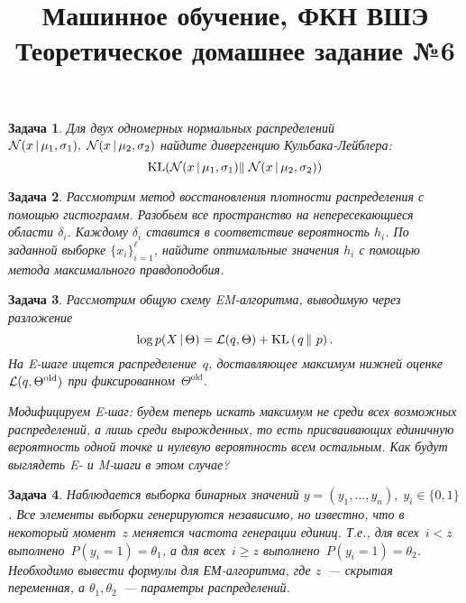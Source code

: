 \documentclass[12pt,fleqn]{article}
\title{Машинное обучение, ФКН ВШЭ\\Теоретическое домашнее задание №6}
\author{}
\date{}
\newtheorem{esProblem}{Задача}
\begin{document}
\maketitle

\begin{esProblem}
    Для двух одномерных нормальных распределений $\mathcal{N}(x\mspace{3mu}{|}\mspace{3mu} \mu_1, \sigma_1), \; \mathcal{N}(x\mspace{3mu}{|}\mspace{3mu} \mu_2, \sigma_2)$ найдите дивергенцию Кульбака-Лейблера:
    \begin{equation*}
        \text{KL}(\mathcal{N}(x\mspace{3mu}{|}\mspace{3mu} \mu_1, \sigma_1)\Vert \; \mathcal{N}(x\mspace{3mu}{|}\mspace{3mu} \mu_2, \sigma_2))
    \end{equation*}
\end{esProblem}

\begin{esProblem}
    Рассмотрим метод восстановления плотности распределения с помощью гистограмм.
    Разобьем все пространство на непересекающиеся области $\delta_i$.
    Каждому $\delta_i$ ставится в соответствие вероятность $h_i$.
    По заданной выборке $\{x_i\}_{i=1}^\ell$, найдите оптимальные значения $h_i$ с помощью метода максимального правдоподобия.
\end{esProblem}

\begin{esProblem}
    Рассмотрим общую схему EM-алгоритма,
    выводимую через разложение
    \[
        \log p(X \mspace{3mu}{|}\mspace{3mu} \Theta)
        =
        \mathcal{L}(q, \Theta)
        +
        \text{KL} \left(\left. {q} \mspace{3mu} \right\| \mspace{3mu} {p} \right).
    \]
    На E-шаге ищется распределение~$q$,
    доставляющее максимум нижней оценке~$\mathcal{L}(q, \Theta^\text{old})$
    при фиксированном~$\Theta^\text{old}$.

    Модифицируем E-шаг: будем теперь искать максимум не среди всех
    возможных распределений, а лишь среди вырожденных,
    то есть присваивающих единичную вероятность одной точке
    и нулевую вероятность всем остальным.
    Как будут выглядеть E- и M-шаги в этом случае?
\end{esProblem}

\begin{esProblem}
    Наблюдается выборка бинарных значений $y = (y_1, \ldots, y_n), \; y_i \in \{0,1\}$.
    Все элементы выборки генерируются независимо, но известно, что в некоторый момент~$z$ меняется частота генерации единиц.
    Т.е., для всех~$i < z$ выполнено~$P(y_i=1) = \theta_1$, а для всех~$i \geq z$ выполнено~$P(y_i=1) = \theta_2$.
    Необходимо вывести формулы для ЕМ-алгоритма, где $z$~--- скрытая переменная, а $\theta_1, \theta_2$~--- параметры распределений.
\end{esProblem}
\end{document}
